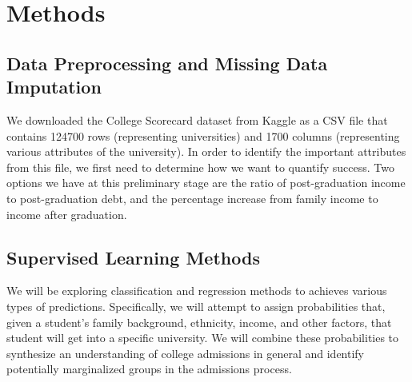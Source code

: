 \documentclass{article} %
\begin{document}
\section{Methods}

\subsection{Data Preprocessing and Missing Data Imputation}

We downloaded the College Scorecard dataset from Kaggle as a CSV file that contains 124700 rows (representing universities) and 1700 columns (representing various attributes of the 
university).  In order to identify the important attributes from this file, we first need to determine how we want to quantify success.  Two options we have at this preliminary stage are the ratio of post-graduation income to post-graduation debt, and the percentage increase from family income to income after graduation.

\subsection{Supervised Learning Methods}
We will be exploring classification and regression methods to achieves various types of predictions. Specifically, we will attempt to assign probabilities that, given a student's family background, ethnicity, income, and other factors, that student will get into a specific university. We will combine these probabilities to synthesize an understanding of college admissions in general and identify potentially marginalized groups in the admissions process.
\end{document}
